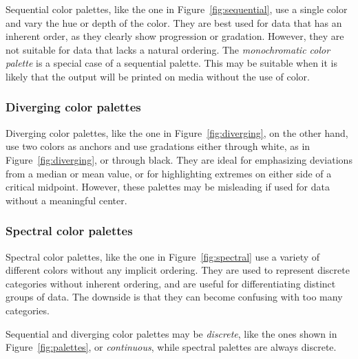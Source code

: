 Sequential color palettes, like the one in Figure~\ref{fig:sequential}, use a single color and vary the hue or depth of the color. They are best used for data that has an inherent order, as they clearly show progression or gradation. However, they are not suitable for data that lacks a natural ordering. The \emph{monochromatic color palette} is a special case of a sequential palette. This may be suitable when it is likely that the output will be printed on media without the use of color. 

\subsubsection*{Diverging color palettes}

Diverging color palettes, like the one in Figure~\ref{fig:diverging}, on the other hand, use two colors as anchors and use gradations either through white, as in Figure~\ref{fig:diverging}, or through black. They are ideal for emphasizing deviations from a median or mean value, or for highlighting extremes on either side of a critical midpoint. However, these palettes may be misleading if used for data without a meaningful center.

\subsubsection*{Spectral color palettes}

Spectral color palettes, like the one in Figure~\ref{fig:spectral} use a variety of different colors without any implicit ordering. They are used to represent discrete categories without inherent ordering, and are useful for differentiating distinct groups of data. The downside is that they can become confusing with too many categories. 

Sequential and diverging color palettes may be \emph{discrete}, like the ones shown in Figure~\ref{fig:palettes}, or \emph{continuous}, while spectral palettes are always discrete.

